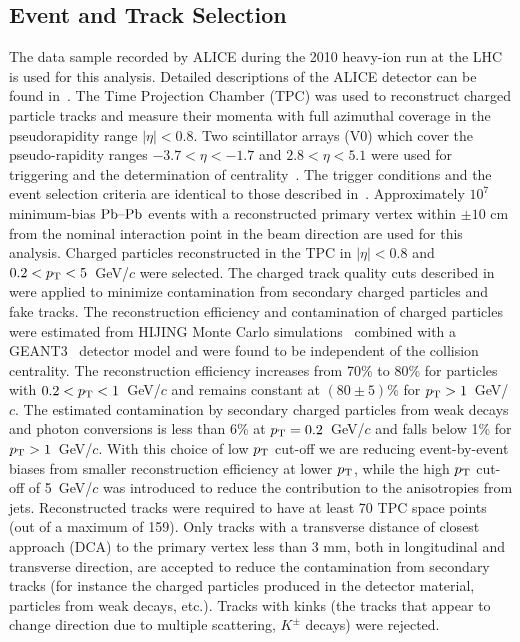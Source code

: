 \subsection{Event and Track Selection}
\label{sec:experiment}
The data sample recorded by ALICE during the 2010 heavy-ion run at the
LHC is used for this analysis. Detailed descriptions of the ALICE
detector can be found
in~\cite{Aamodt:2008zz,Carminati:2004fp,Alessandro:2006yt}. The Time
Projection Chamber (TPC) was used to reconstruct charged particle
tracks and measure their momenta with full azimuthal coverage in the
pseudorapidity range $|\eta|<0.8$. Two scintillator
arrays (V0) which cover the pseudo-rapidity ranges $-3.7<\eta<-1.7$
and $2.8<\eta<5.1$ were used for triggering and the determination of
centrality~\cite{Aamodt:2010cz}. The trigger
conditions and the event selection criteria are identical to those
described in~\cite{Aamodt:2010pa, Aamodt:2010cz}.
Approximately $10^7$ minimum-bias $\textnormal{Pb--Pb}$ events with
a reconstructed primary vertex within $\pm 10$ cm from the nominal
interaction point in the beam direction are used for this
analysis. Charged particles reconstructed in the TPC in $|\eta|<0.8$
and $0.2<p_{\rm T}<5$~GeV/$c$ were selected. The charged track quality cuts
described in~\cite{Aamodt:2010pa} were applied to minimize
contamination from secondary charged particles and fake tracks.
The reconstruction efficiency and contamination of charged particles
were estimated from HIJING Monte Carlo
simulations~\cite{Wang:1991hta} combined with a GEANT3~\cite{Brun:1994aa} detector model and were found to be independent of
the collision centrality. The reconstruction efficiency increases from
70\% to 80\% for particles with $0.2<p_{\rm T}<1$~GeV/$c$ and remains
constant at $(80 \pm 5)$\% for $p_{\rm T}>1$~GeV/$c$. The estimated
contamination by secondary charged particles from weak decays and
photon conversions is less than 6\% at $p_{\rm T}=0.2$~GeV/$c$ and falls
below 1\% for $p_{\rm T}>1$~GeV/$c$.
With this choice of low $p_{\rm T}$ cut-off we are reducing event-by-event biases from smaller reconstruction efficiency 
at lower $p_{\rm T}$, while the high $p_{\rm T}$ cut-off of 5~GeV/$c$ was introduced to reduce the contribution to the anisotropies from jets. 
Reconstructed tracks were required to have at least 70 TPC space points (out of a maximum of 159). 
Only tracks with a transverse distance of closest approach (DCA) to the primary vertex less than 3 mm, both in longitudinal and transverse direction, are accepted to reduce the contamination from secondary tracks (for instance the charged particles produced 
in the detector material, particles from weak decays, etc.). 
Tracks with kinks (the tracks that appear to change direction due to multiple scattering, $K^{\pm}$ decays) were rejected.


